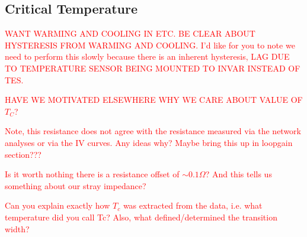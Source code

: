 


\subsection{Critical Temperature}
\label{sec:critical_temp}

\textcolor{red}{WANT WARMING AND COOLING IN ETC. BE CLEAR ABOUT HYSTERESIS FROM WARMING AND COOLING. I'd like for you to note we need to perform this slowly because there is an inherent hysteresis, LAG DUE TO TEMPERATURE SENSOR BEING MOUNTED TO INVAR INSTEAD OF TES.}

\textcolor{red}{HAVE WE MOTIVATED ELSEWHERE WHY WE CARE ABOUT VALUE OF $T_{C}$?}

\textcolor{red}{Note, this resistance does not agree with the resistance measured via the network analyses or via the IV curves. Any ideas why? Maybe bring this up in loopgain section???}

\textcolor{red}{Is it worth nothing there is a resistance offset of $\sim 0.1 \Omega$? And this tells us something about our stray impedance?}

\textcolor{red}{Can you explain exactly how $T_{c}$ was extracted from the data, i.e. what temperature did you call Tc? Also, what defined/determined the transition width?}

